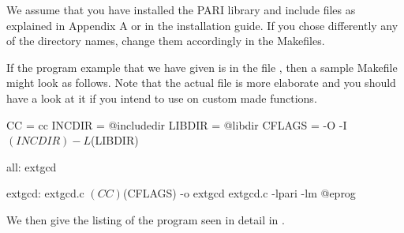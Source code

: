%
%

We assume that you have installed the PARI library and include files as
explained in Appendix A or in the installation guide. If you chose
differently any of the directory names, change them accordingly in the
Makefiles.

If the program example that we have given is in the file , then
a sample Makefile might look as follows. Note that the actual file
 is more elaborate and you should have a look at it if
you intend to use  on custom made functions.

\bprog
CC = cc
INCDIR = @includedir
LIBDIR = @libdir
CFLAGS = -O -I$(INCDIR) -L$(LIBDIR)

all:  extgcd

extgcd:  extgcd.c
      $(CC) $(CFLAGS) -o extgcd extgcd.c -lpari -lm
@eprog

\noindent We then give the listing of the program 
seen in detail in .

\vfill\eject
